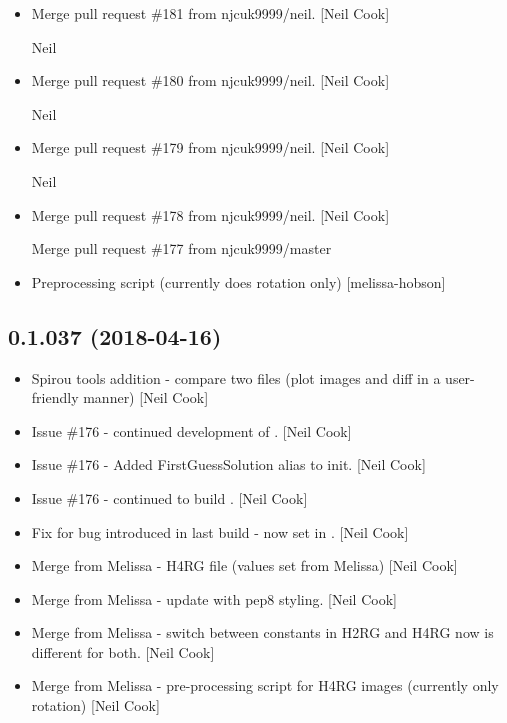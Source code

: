 \documentclass[a4paper,10pt,english]{report}
\begin{document}
\begin{itemize}
\item {} 
Merge pull request \#181 from njcuk9999/neil. {[}Neil Cook{]}

Neil

\item {} 
Merge pull request \#180 from njcuk9999/neil. {[}Neil Cook{]}

Neil

\item {} 
Merge pull request \#179 from njcuk9999/neil. {[}Neil Cook{]}

Neil

\item {} 
Merge pull request \#178 from njcuk9999/neil. {[}Neil Cook{]}

Merge pull request \#177 from njcuk9999/master

\item {} 
Preprocessing script (currently does rotation only) {[}melissa-hobson{]}

\end{itemize}


\subsection{0.1.037 (2018-04-16)}
\label{\detokenize{misc/changelog:id462}}\begin{itemize}
\item {} 
Spirou tools addition - compare two files (plot images and diff in a
user-friendly manner) {[}Neil Cook{]}

\item {} 
Issue \#176 - continued development of . {[}Neil Cook{]}

\item {} 
Issue \#176 - Added FirstGuessSolution alias to init. {[}Neil Cook{]}

\item {} 
Issue \#176 - continued to build . {[}Neil Cook{]}

\item {} 
Fix for bug introduced in last build -  now set in
. {[}Neil Cook{]}

\item {} 
Merge from Melissa - H4RG  file (values set from
Melissa) {[}Neil Cook{]}

\item {} 
Merge from Melissa - update  with pep8 styling.
{[}Neil Cook{]}

\item {} 
Merge from Melissa - switch between constants in H2RG and H4RG now
 is different for both. {[}Neil Cook{]}

\item {} 
Merge from Melissa - pre-processing script for H4RG images (currently
only rotation) {[}Neil Cook{]}

\end{itemize}
\end{document}
